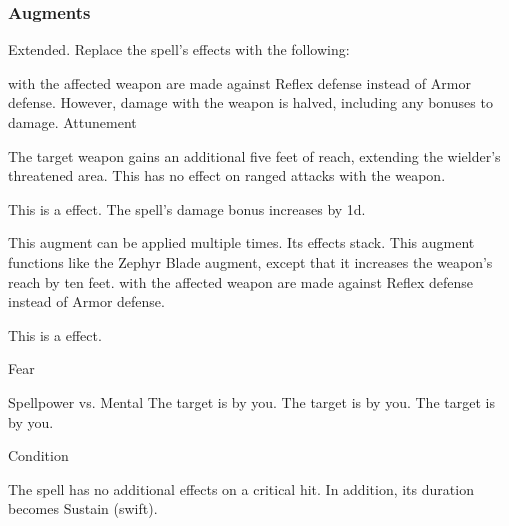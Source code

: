 \subsubsection{Augments}
 Extended.
Replace
the spell's effects with the following:
\begin{augmenteffects}
\spelleffect
{} with the affected weapon are made against Reflex defense instead of Armor defense.
However, damage with the weapon is halved, including any bonuses to damage.
\spelldur Attunement
\end{augmenteffects}
The target weapon gains an additional five feet of reach, extending the wielder's threatened area.
This has no effect on ranged attacks with the weapon.
\par
This is a  effect.
The spell's damage bonus increases by \plus1d.
\par
This augment can be applied multiple times.
Its effects stack.
This augment functions like the Zephyr Blade augment, except that it increases the weapon's reach by ten feet.
 with the affected weapon are made against Reflex defense instead of Armor defense.
\par
This is a  effect.
\begin{spellsection}{Fear}
\begin{spellheader}
\end{spellheader}
\begin{spellcontent}
\begin{spelltargetinginfo}
\end{spelltargetinginfo}
\begin{spelleffects}
\begin{spellattack}{Spellpower vs. Mental}
\spellsuccess The target is \frightened by you.
\spellcritical The target is \panicked by you.
\spellfailure The target is \shaken by you.
\end{spellattack}
\spelldur Condition
\end{spelleffects}
\end{spellcontent}
\begin{spellfooter}
\miscastexplode
\end{spellfooter}
\begin{spellcantrip}
The spell has no additional effects on a critical hit.
In addition, its duration becomes Sustain (swift).
\end{spellcantrip}
\end{spellsection}
